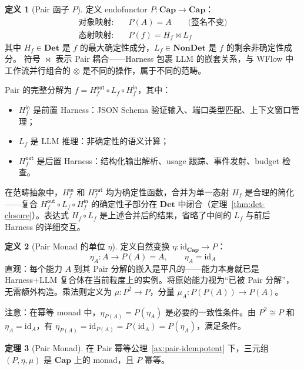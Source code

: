 \documentclass[11pt,a4paper]{article}
\theoremstyle{definition}
\newtheorem{theorem}{定理}[section]
\theoremstyle{definition}
\newtheorem{definition}[theorem]{定义}
\theoremstyle{remark}
\newcommand{\cat}[1]{\mathbf{#1}}
\newcommand{\catCap}{\cat{Cap}}
\newcommand{\catDet}{\cat{Det}}
\newcommand{\catNonDet}{\cat{NonDet}}
\newcommand{\id}{\mathrm{id}}
\newcommand{\functor}[3]{#1: #2 \to #3}
\newcommand{\tensor}{\otimes}
\newcommand{\pairMonad}{P}
\newcommand{\pairCoupling}{\bowtie}     %
\begin{document}
\begin{definition}[Pair 函子 $\pairMonad$]
定义 endofunctor $\functor{\pairMonad}{\catCap}{\catCap}$：
\[
\begin{aligned}
\text{对象映射:}&\quad \pairMonad(A) = A \qquad\text{(签名不变)} \\
\text{态射映射:}&\quad \pairMonad(f) = H_f \pairCoupling L_f
\end{aligned}
\]
其中 $H_f \in \catDet$ 是 $f$ 的最大确定性成分，$L_f \in \catNonDet$ 是 $f$ 的剩余非确定性成分。
符号 $\pairCoupling$ 表示 Pair 耦合——Harness 包裹 LLM 的嵌套关系，与 WFlow 中工作流并行组合的 $\tensor$ 是不同的操作，属于不同的范畴。

Pair 的完整分解为 $f = H_f^{\mathsf{out}} \circ L_f \circ H_f^{\mathsf{in}}$，其中：
\begin{itemize}[leftmargin=2em]
    \item $H_f^{\mathsf{in}}$ 是前置 Harness：JSON Schema 验证输入、端口类型匹配、上下文窗口管理；
    \item $L_f$ 是 LLM 推理：非确定性的语义计算；
    \item $H_f^{\mathsf{out}}$ 是后置 Harness：结构化输出解析、usage 跟踪、事件发射、budget 检查。
\end{itemize}
在范畴抽象中，$H_f^{\mathsf{in}}$ 和 $H_f^{\mathsf{out}}$ 均为确定性函数，合并为单一态射 $H_f$ 是合理的简化——复合 $H_f^{\mathsf{out}} \circ L_f \circ H_f^{\mathsf{in}}$ 的确定性子部分在 $\catDet$ 中闭合（定理~\ref{thm:det-closure}）。表达式 $H_f \circ L_f$ 是上述合并后的结果，省略了中间的 $L_f$ 与前后 Harness 的详细交互。
\end{definition}

\begin{definition}[Pair Monad 的单位 $\eta$]
定义自然变换 $\functor{\eta}{\id_{\catCap}}{\pairMonad}$：
\[
\eta_A: A \to \pairMonad(A) = A, \qquad \eta_A = \id_A
\]
直观：每个能力 $A$ 到其 Pair 分解的嵌入是平凡的——能力本身就已是 Harness+LLM 复合体在当前粒度上的实例。将原始能力视为``已被 Pair 分解''，无需额外构造。乘法则定义为 $\functor{\mu}{\pairMonad^2}{\pairMonad}$，分量 $\mu_A: \pairMonad(\pairMonad(A)) \to \pairMonad(A)$。

注意：在幂等 monad 中，$\eta_{\pairMonad(A)} = \pairMonad(\eta_A)$ 是必要的一致性条件。由 $P^2 \cong P$ 和 $\eta_A = \id_A$，有 $\eta_{P(A)} = \id_{P(A)} = P(\id_A) = P(\eta_A)$，满足条件。
\end{definition}

\begin{theorem}[Pair Monad]
在 Pair 幂等公理~\ref{ax:pair-idempotent} 下，三元组 $(\pairMonad, \eta, \mu)$ 是 $\catCap$ 上的 monad，且 $\pairMonad$ 幂等。
\label{thm:pair-monad}
\end{theorem}
\end{document}
